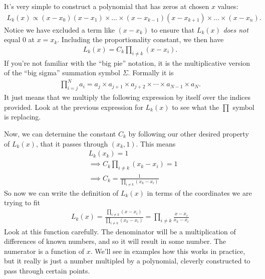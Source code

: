 It's very simple to construct a polynomial that has zeros at chosen $x$ values:
\begin{align*}
L_k(x) \propto (x-x_0)(x-x_1)\times \dots \times(x-x_{k-1})(x-x_{k+1})\times \dots \times(x-x_{n}).
\end{align*}
Notice we have excluded a term like $(x-x_k)$ to ensure that $L_k(x)$ \textit{does not} equal 0 at $x=x_k$. Including the proportionality constant, we then have
\begin{align*}
L_k(x) = C_k \prod_{i\neq k} (x-x_i).
\end{align*}
If you're not familiar with the ``big pie'' notation, it is the multiplicative version of the ``big sigma'' summation symbol $\Sigma$. Formally it is
\begin{align*}
\prod_{i=j}^{N} a_i = a_j \times a_{j+1} \times a_{j+2} \times \cdots \times a_{N-1} \times a_{N}.
\end{align*}
It just means that we multiply the following expression by itself over the indices provided. Look at the previous expression for $L_k(x)$ to see what the $\prod$ symbol is replacing.

Now, we can determine the constant $C_k$ by following our other desired property of $L_k(x)$, that it passes through $(x_k,1)$. This means
\begin{align*}
& L_k(x_k) = 1 \\
& \implies C_k \prod_{i\neq k} (x_k-x_i) = 1 \\
& \implies C_k  = \frac{1}{\prod_{i\neq k} (x_k-x_i)}
\end{align*}
So now we can write the definition of $L_k(x)$ in terms of the coordinates we are trying to fit
\begin{align*}
L_k(x) = \frac{\prod_{i\neq k} (x-x_i)}{\prod_{i\neq k} (x_k-x_i)}  = \prod_{i\neq k} \frac{x-x_i}{x_k-x_i} 
\end{align*}
Look at this function carefully. The denominator will be a multiplication of differences of known numbers, and so it will result in some number. The numerator is a function of $x$. We'll see in examples how this works in practice, but it really is just a number multipled by a polynomial, cleverly constructed to pass through certain points.

